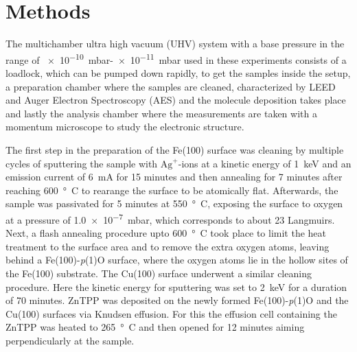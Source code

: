 \chapter{Methods}

The multichamber ultra high vacuum (UHV) system with a base pressure in the range of \qty{e-10}{mbar}-\qty{e-11}{mbar} used in these experiments consists of a loadlock, which can be pumped down rapidly, to get the samples inside the setup, a preparation chamber where the samples are cleaned, characterized by LEED and Auger Electron Spectroscopy (AES) and the molecule deposition takes place and lastly the analysis chamber where the measurements are taken with a momentum microscope to study the electronic structure.

The first step in the preparation of the Fe(100) surface was cleaning by multiple cycles of sputtering the sample with $\mathrm{Ag}^+$-ions at a kinetic energy of \qty{1}{keV} and an emission current of \qty{6}{mA} for 15 minutes and then annealing for 7 minutes after reaching \qty{600}{°C} to rearange the surface to be atomically flat.
Afterwards, the sample was passivated for 5 minutes at \qty{550}{°C}, exposing the surface to oxygen at a pressure of \qty{1.0e-7}{mbar}, which corresponds to about 23 Langmuirs.
Next, a flash annealing procedure upto \qty{600}{°C} took place to limit the heat treatment to the surface area and to remove the extra oxygen atoms, leaving behind a Fe(100)-\textit{p}(1)O surface, where the oxygen atoms lie in the hollow sites of the Fe(100) substrate.
The Cu(100) surface underwent a similar cleaning procedure.
Here the kinetic energy for sputtering was set to \qty{2}{keV} for a duration of 70 minutes.
ZnTPP was deposited on the newly formed Fe(100)-\textit{p}(1)O and the Cu(100) surfaces via Knudsen effusion.
For this the effusion cell containing the ZnTPP was heated to \qty{265}{°C} and then opened for 12 minutes aiming perpendicularly at the sample.

